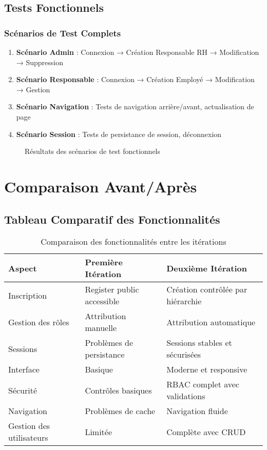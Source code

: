 \documentclass[12pt,a4paper]{article}
\begin{document}
\subsection{Tests Fonctionnels}

\subsubsection{Scénarios de Test Complets}
\begin{enumerate}
    \item \textbf{Scénario Admin} : Connexion → Création Responsable RH → Modification → Suppression
    \item \textbf{Scénario Responsable} : Connexion → Création Employé → Modification → Gestion
    \item \textbf{Scénario Navigation} : Tests de navigation arrière/avant, actualisation de page
    \item \textbf{Scénario Session} : Tests de persistance de session, déconnexion
\end{enumerate}

\begin{figure}[H]
    \centering
    \caption{Résultats des scénarios de test fonctionnels}
    \label{fig:scenarios_test_complets}
\end{figure}

\section{Comparaison Avant/Après}

\subsection{Tableau Comparatif des Fonctionnalités}

\begin{table}[H]
\centering
\begin{tabular}{|p{4cm}|p{5cm}|p{5cm}|}
\hline
\textbf{Aspect} & \textbf{Première Itération} & \textbf{Deuxième Itération} \\
\hline
Inscription & Register public accessible & Création contrôlée par hiérarchie \\
\hline
Gestion des rôles & Attribution manuelle & Attribution automatique \\
\hline
Sessions & Problèmes de persistance & Sessions stables et sécurisées \\
\hline
Interface & Basique & Moderne et responsive \\
\hline
Sécurité & Contrôles basiques & RBAC complet avec validations \\
\hline
Navigation & Problèmes de cache & Navigation fluide \\
\hline
Gestion des utilisateurs & Limitée & Complète avec CRUD \\
\hline
\end{tabular}
\caption{Comparaison des fonctionnalités entre les itérations}
\label{tab:comparaison_fonctionnalites}
\end{table}
\end{document}

